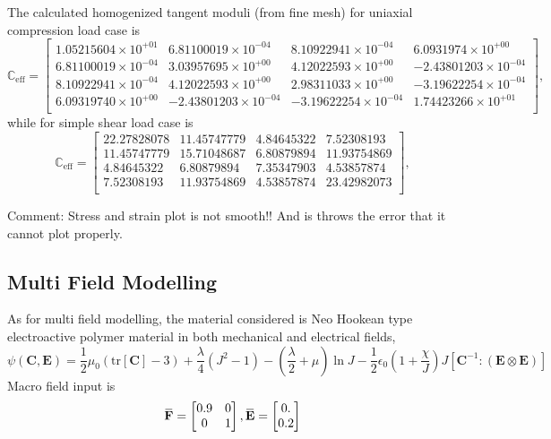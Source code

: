 \documentclass[10pt,a4paper]{scrreprt}
\newcommand{\overbar}[1]{\mkern 1.5mu\overline{\mkern-1.5mu#1\mkern-1.5mu}\mkern 1.5mu}
\begin{document}
The calculated homogenized tangent moduli (from fine mesh) for uniaxial compression load case is 
\begin{equation}
\mathbb{C}_{\text{eff}} = 
\begin{bmatrix}
1.05215604 \times 10^{+01} &  6.81100019\times 10^{-04}  & 8.10922941\times 10^{-04} & 6.0931974\times 10^{+00} \\
6.81100019\times 10^{-04} &  3.03957695\times 10^{+00} &  4.12022593\times 10^{+00} & -2.43801203\times 10^{-04}\\
8.10922941\times 10^{-04} &  4.12022593\times 10^{+00} &  2.98311033\times 10^{+00} & -3.19622254\times 10^{-04}\\
6.09319740\times 10^{+00} & -2.43801203\times 10^{-04} & -3.19622254\times 10^{-04} &  1.74423266\times 10^{+01}\\
\end{bmatrix},
\end{equation}
while for simple shear load case is 
\begin{equation}
\mathbb{C}_{\text{eff}} = 
\begin{bmatrix}
22.27828078 & 11.45747779 &  4.84645322 &  7.52308193 \\
11.45747779 & 15.71048687 &  6.80879894 & 11.93754869 \\
4.84645322 &  6.80879894  & 7.35347903 &  4.53857874 \\
7.52308193 & 11.93754869 &  4.53857874 & 23.42982073 \\
\end{bmatrix},
\end{equation}

Comment: Stress and strain plot is not smooth!! And is throws the error that it cannot plot properly.


\subsection{Multi Field Modelling}
As for multi field modelling, the material considered is Neo Hookean type electroactive polymer material in both mechanical and electrical fields, 
\begin{equation}
\label{eq: nhk}
\psi\left( \mathbf{C}, \mathbf{E} \right) =  \frac{1}{2}\mu_{0} \left( \text{tr}[\mathbf{C}]-3 \right) + \dfrac{\lambda}{4} \left( J^{2}-1 \right) - \left( \dfrac{\lambda}{2} + \mu \right) \ln J - \frac{1}{2} \epsilon_{0} \left( 1+\dfrac{\chi}{J} \right) J \left[ \mathbf{C}^{-1}: (\mathbf{E} \otimes \mathbf{E}) \right]
\end{equation}
Macro field input is 
\[
\overbar{\mathbf{F}} = 
\begin{bmatrix}
0.9 & 0 \\
0 & 1 \\
\end{bmatrix},
\overbar{\mathbf{E}} = 
\begin{bmatrix}
0. \\
0.2
\end{bmatrix}
\]
\end{document}
